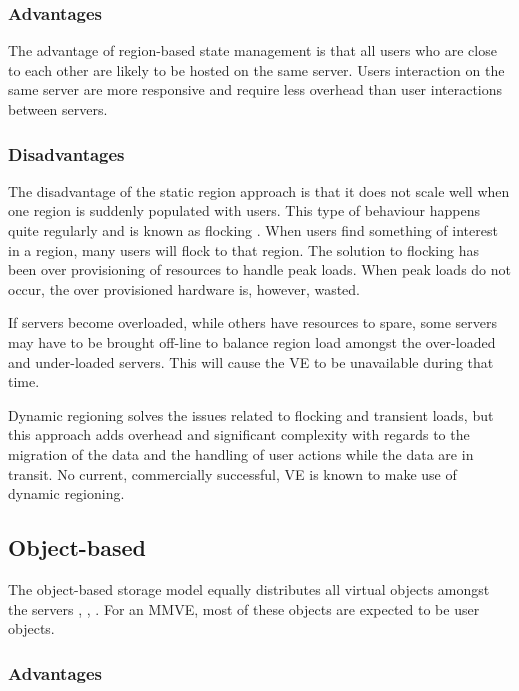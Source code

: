 \subsubsection{Advantages}

The advantage of region-based state management is that all users who are close to each other are likely to be hosted on the same server. Users interaction on the same server are more responsive and require less overhead than user interactions between servers.

\subsubsection{Disadvantages}

The disadvantage of the static region approach is that it does not scale well when one region is suddenly populated with users. This type of behaviour happens quite regularly and is known as flocking \cite{flocking}. When users find something of interest in a region, many users will flock to that region. The solution to flocking has been over provisioning of resources to handle peak loads. When peak loads do not occur, the over provisioned hardware is, however, wasted.

If servers become overloaded, while others have resources to spare, some servers may have to be brought off-line to balance region load amongst the over-loaded and under-loaded servers. This will cause the VE to be unavailable during that time.

Dynamic regioning solves the issues related to flocking and transient loads, but this approach adds overhead and significant complexity with regards to the migration of the data and the handling of user actions while the data are in transit. No current, commercially successful, VE is known to make use of dynamic regioning.

\subsection{Object-based}

The object-based storage model equally distributes all virtual objects amongst the servers \cite{object_based_consistency1}, \cite{object_based_consistency2}, \cite{object_based_consistency3}. For an MMVE, most of these objects are expected to be user objects.

\subsubsection{Advantages}

